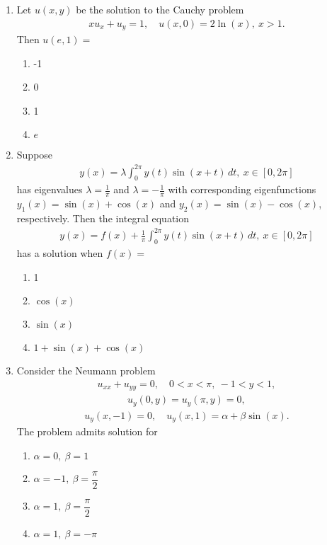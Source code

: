 \documentclass[journal]{IEEEtran}
\numberwithin{equation}{enumi}
\numberwithin{figure}{enumi}
\begin{document}
\begin{enumerate}
\item Let $u(x,y)$ be the solution to the Cauchy problem
\begin{align*}
x u_x + u_y = 1, \quad u(x,0) = 2 \ln(x),\ x > 1.
\end{align*}
Then $u(e,1) =$
\hfill{}
\begin{multicols}{4}
\begin{enumerate}
    \item -1
    \item 0
    \item 1
    \item $e$
\end{enumerate}
\end{multicols}



\item Suppose
\begin{align*}
y(x) = \lambda \int_0^{2\pi} y(t) \sin(x + t)\, dt,\ x \in [0,2\pi]
\end{align*}
has eigenvalues $\lambda = \frac{1}{\pi}$ and $\lambda = -\frac{1}{\pi}$ with corresponding eigenfunctions \\
$y_1(x) = \sin(x) + \cos(x)$ and $y_2(x) = \sin(x) - \cos(x)$, respectively. Then the integral equation
\begin{align*}
y(x) = f(x) + \frac{1}{\pi} \int_0^{2\pi} y(t) \sin(x + t)\, dt,\ x \in [0,2\pi]
\end{align*}
has a solution when $f(x) =$
\hfill{}
\begin{multicols}{4}
\begin{enumerate}
    \item 1
    \item $\cos(x)$
    \item $\sin(x)$
    \item $1 + \sin(x) + \cos(x)$
\end{enumerate}
\end{multicols}



\item Consider the Neumann problem
\begin{align*}
u_{xx} + u_{yy} = 0,\quad 0 < x < \pi,\ -1 < y < 1,
\end{align*}
\begin{align*}
u_y(0, y) = u_y(\pi, y) = 0,
\end{align*}
\begin{align*}
u_y(x, -1) = 0,\quad u_y(x, 1) = \alpha + \beta \sin(x).
\end{align*}
The problem admits solution for
\hfill{}
\begin{multicols}{2}
    \begin{enumerate}
        \item $\alpha = 0,\ \beta = 1$
        \item $\alpha = -1,\ \beta = \dfrac{\pi}{2}$ 
        \item $\alpha = 1,\ \beta = \dfrac{\pi}{2}$
        \item $\alpha = 1,\ \beta = -\pi$
    \end{enumerate}
    \end{multicols}



\end{enumerate}
\end{document}
